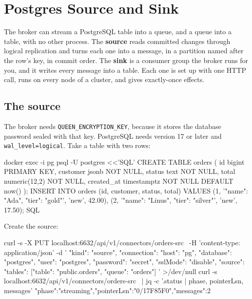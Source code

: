 
\section{Postgres Source and Sink}

The broker can stream a PostgreSQL table into a queue, and a queue into a table, with no other
process. The \textbf{source} reads committed changes through logical replication and turns each one
into a message, in a partition named after the row's key, in commit order. The \textbf{sink} is a
consumer group the broker runs for you, and it writes every message into a table. Each one is set
up with one HTTP call, runs on every node of a cluster, and gives exactly-once effects.


\subsection{The source}

The broker needs \texttt{QUEEN\_ENCRYPTION\_KEY}, because it stores the database password sealed
with that key. PostgreSQL needs version 17 or later and \texttt{wal\_level=logical}. Take a table
with two rows:

\begin{shell}
docker exec -i pg psql -U postgres <<'SQL'
CREATE TABLE orders (
  id         bigint PRIMARY KEY,
  customer   jsonb NOT NULL,
  status     text NOT NULL,
  total      numeric(12,2) NOT NULL,
  created_at timestamptz NOT NULL DEFAULT now()
);
INSERT INTO orders (id, customer, status, total) VALUES
  (1, '{"name": "Ada", "tier": "gold"}', 'new', 42.00),
  (2, '{"name": "Linus", "tier": "silver"}', 'new', 17.50);
SQL
\end{shell}

Create the source:

\begin{shell}
curl -s -X PUT localhost:6632/api/v1/connectors/orders-src \
  -H 'content-type: application/json' -d '{
  "kind": "source",
  "connection": {"host": "pg", "database": "postgres", "user": "postgres",
                 "password": "secret", "sslMode": "disable"},
  "source": {"tables": [{"table": "public.orders", "queue": "orders"}]}
}' >/dev/null
curl -s localhost:6632/api/v1/connectors/orders-src \
  | jq -c '.status | {phase, pointerLsn, messages}'
{"phase":"streaming","pointerLsn":"0/17F85F0","messages":2}
\end{shell}

